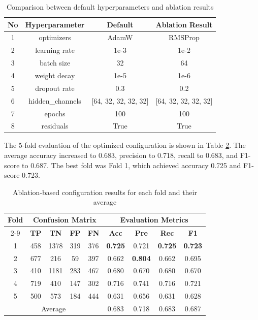 \documentclass[10pt,TimesNewRoman,a4paper]{matrikenglish}
\begin{document}
\begin{table}[H]
    \centering
    \caption{Comparison between default hyperparameters and ablation results}
    \label{tab:hyperparams-default-ablasi}
    \begin{tabular}{c c c c}
        \hline
        \textbf{No} & \textbf{Hyperparameter} & \textbf{Default} & \textbf{Ablation Result} \\ \hline
        1 & optimizers & AdamW & RMSProp \\ 
        2 & learning rate & 1e-3 & 1e-2 \\ 
        3 & batch size & 32 & 64 \\ 
        4 & weight decay & 1e-5 & 1e-6 \\ 
        5 & dropout rate & 0.3 & 0.2 \\ 
        6 & hidden\_channels & [64, 32, 32, 32, 32] & [64, 32, 32, 32, 32] \\ 
        7 & epochs & 100 & 100 \\ 
        8 & residuals & True & True \\ \hline
    \end{tabular}
\end{table}

The 5-fold evaluation of the optimized configuration is shown in Table \ref{tab:evaluasi-fold-ablasi}. The average accuracy increased to 0.683, precision to 0.718, recall to 0.683, and F1-score to 0.687. The best fold was Fold 1, which achieved accuracy 0.725 and F1-score 0.723.

\begin{table}[H]
    \centering
    \caption{Ablation-based configuration results for each fold and their average}
    \label{tab:evaluasi-fold-ablasi}
    \begin{tabular}{c c c c c c c c c}
        \hline
        \multirow{2}{*}{\textbf{Fold}} & \multicolumn{4}{c}{\textbf{Confusion Matrix}} & \multicolumn{4}{c}{\textbf{Evaluation Metrics}} \\ \cline{2-9}
         & \textbf{TP} & \textbf{TN} & \textbf{FP} & \textbf{FN} & \textbf{Acc} & \textbf{Pre} & \textbf{Rec} & \textbf{F1} \\ \hline
        1 & 458 & 1378 & 319 & 376 & \textbf{0.725} & 0.721 & \textbf{0.725} & \textbf{0.723} \\ 
        2 & 677 & 216 & 59 & 397 & 0.662 & \textbf{0.804} & 0.662 & 0.695 \\ 
        3 & 410 & 1181 & 283 & 467 & 0.680 & 0.670 & 0.680 & 0.670 \\ 
        4 & 719 & 410 & 147 & 302 & 0.716 & 0.741 & 0.716 & 0.721 \\ 
        5 & 500 & 573 & 184 & 444 & 0.631 & 0.656 & 0.631 & 0.628 \\ \hline
        \multicolumn{5}{c}{Average} & 0.683 & 0.718 & 0.683 & 0.687 \\ \hline
    \end{tabular}
\end{table}
\end{document}
